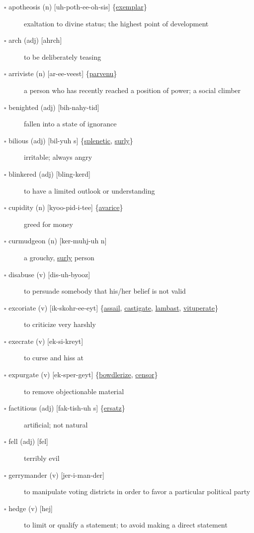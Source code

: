\documentclass[11pt]{article}
\begin{document}
\begin{description}
\item[{$\square$ \label{org5669122}apotheosis (n) [uh-poth-ee-oh-sis] \{\hyperref[orgab46517]{exemplar}\}}] exaltation to divine status; the highest point of development
\item[{$\square$ arch (adj) [ahrch]}] to be deliberately teasing
\item[{$\square$ \label{org8cd8fa4}arriviste (n) [ar-ee-veest] \{\hyperref[org313bbe0]{parvenu}\}}] a person who has recently reached a position of power; a social climber
\item[{$\square$ benighted (adj) [bih-nahy-tid]}] fallen into a state of ignorance
\item[{$\square$ \label{org702a6c2}bilious (adj) [bil-yuh s] \{\hyperref[org5650bf8]{splenetic}, \hyperref[orgb7ecd9a]{surly}\}}] irritable; always angry
\item[{$\square$ blinkered (adj) [bling-kerd]}] to have a limited outlook or understanding
\item[{$\square$ \label{org0c34aaa}cupidity (n) [kyoo-pid-i-tee] \{\hyperref[org13c6f4e]{avarice}\}}] greed for money
\item[{$\square$ curmudgeon (n) [ker-muhj-uh n]}] a grouchy, \hyperref[orgb7ecd9a]{surly} person
\item[{$\square$ disabuse (v) [dis-uh-byooz]}] to persuade somebody that his/her belief is not valid
\item[{$\square$ \label{org58b0cbc}excoriate (v) [ik-skohr-ee-eyt] \{\hyperref[orgb5ea66c]{assail}, \hyperref[org41ed9c5]{castigate}, \hyperref[orgcb82180]{lambast}, \hyperref[orgad849f5]{vituperate}\}}] to criticize very harshly
\item[{$\square$ execrate (v) [ek-si-kreyt]}] to curse and hiss at
\item[{$\square$ \label{orgdf717a8}expurgate (v) [ek-sper-geyt] \{\hyperref[org5c645ad]{bowdlerize}, \hyperref[org3a963c4]{censor}\}}] to remove objectionable material
\item[{$\square$ \label{orgb99bfb4}factitious (adj) [fak-tish-uh s] \{\hyperref[org352b751]{ersatz}\}}] artificial; not natural
\item[{$\square$ fell (adj) [fel]}] terribly evil
\item[{$\square$ gerrymander (v) [jer-i-man-der]}] to manipulate voting districts in order to favor a particular political party
\item[{$\square$ hedge (v) [hej]}] to limit or qualify a statement; to avoid making a direct statement

\end{description}
\end{document}
